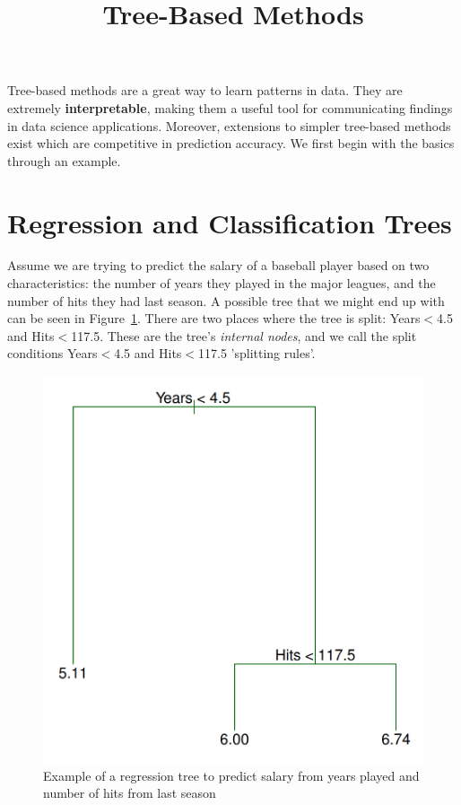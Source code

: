 \documentclass[10pt,a4paper]{article}
\title{Tree-Based Methods}
\begin{document}
\maketitle 

Tree-based methods are a great way to learn patterns in data. They are extremely \textbf{interpretable}, making them a useful tool for communicating findings in data science applications. Moreover, extensions to simpler tree-based methods exist which are competitive in prediction accuracy. We first begin with the basics through an example.

\section{Regression and Classification Trees}
Assume we are trying to predict the salary of a baseball player based on two characteristics: the number of years they played in the major leagues, and the number of hits they had last season. A possible tree that we might end up with can be seen in Figure~\ref{regtree}. There are two places where the tree is split: Years$<$4.5 and Hits$<$117.5. These are the tree's \textit{internal nodes}, and we call the split conditions Years$<$4.5 and Hits$<$117.5  'splitting rules'.

\begin{figure}[H]
\centering
\includegraphics[scale=.5]{regression_tree.png}
\caption{Example of a regression tree to predict salary from years played and number of hits from last season}
\label{regtree}
\end{figure}
\end{document}
